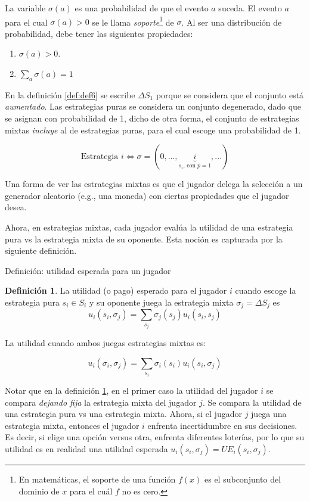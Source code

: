 \documentclass[12pt]{scrartcl}
\theoremstyle{definition}
\newtheorem{defi}{Definición}[section]
\begin{document}
La variable $\sigma(a)$ es una probabilidad de que el evento $a$ suceda. El evento $a$ para el cual $\sigma(a) > 0$ se le llama \textit{soporte}\footnote{
En matemáticas, el soporte de una función $f(x)$ es el subconjunto del dominio de $x$ para el cuál $f$ no es cero.
} de $\sigma$. Al ser una distribución de probabilidad, debe tener las siguientes propiedades:

\begin{enumerate}
    \item $\sigma(a) > 0$.
    \item $\sum_a \sigma(a) = 1$
\end{enumerate}
En la definición \ref{def:def6} se escribe $\Delta S_1$ porque se considera que el conjunto está \textit{aumentado}. Las estrategias puras se considera un conjunto degenerado, dado que se asignan con probabilidad de 1, dicho de otra forma, el conjunto de estrategias mixtas \textit{incluye} al de estrategias puras, para el cual escoge una probabilidad de 1. 

\[ \text{Estrategia } i \Longleftrightarrow \sigma = (0, ..., \underbrace{i}_\text{$s_i$, con $p=1$}, ... )\]

Una forma de ver las estrategias mixtas es que el jugador delega la selección a un generador aleatorio (e.g., una moneda) con ciertas propiedades que el jugador desea. 

Ahora, en estrategias mixtas, cada jugador evalúa la utilidad de una estrategia pura vs la estrategia mixta de su oponente. Esta noción es capturada por la siguiente definición.

\begin{mybox}{Definición: utilidad esperada para un jugador}
    \begin{defi}
        La utilidad (o pago) esperado para el jugador $i$ cuando escoge la estrategia pura $s_i \in S_i$ y su oponente juega la estrategia mixta $\sigma_{j} = \Delta S_{j}$ es 
        \[ u_i(s_i, \sigma_{j}) = \sum_{s_{j}} \sigma_{j}(s_{j})u_i(s_i,s_{j}) \]
        
        La utilidad cuando ambos juegas estrategias mixtas es:
        
        \[ u_i(\sigma_i, \sigma_{j}) = \sum_{s_{i}} \sigma_{i}(s_i)u_i(s_i,\sigma_{j}) \]
        \label{def:def_mix_util}
    \end{defi}
\end{mybox}

Notar que en la definición \ref{def:def_mix_util}, en el primer caso la utilidad del jugador $i$ se compara \textit{dejando fija} la estrategia mixta del jugador $j$. Se compara la utilidad de una estrategia pura vs una estrategia mixta. Ahora, si el jugador $j$ juega una estrategia mixta, entonces el jugador $i$ enfrenta incertidumbre en sus decisiones. Es decir, si elige una opción versus otra, enfrenta diferentes loterías, por lo que su utilidad es en realidad una utilidad esperada $u_i(s_i, \sigma_{j}) = UE_i(s_i, \sigma_{j})$. 
\end{document}
